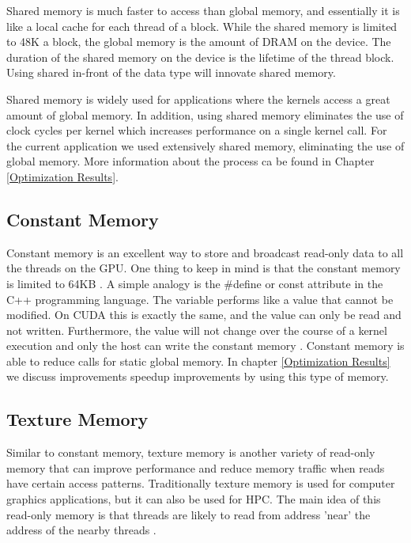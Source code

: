 Shared memory is much faster to access than global memory, and essentially it is like a local cache for each thread of a block. While  the shared memory is limited to 48K a block, the global memory is the amount of DRAM on the device. The duration of the shared memory on the device is the lifetime of the thread block. Using \twoline shared \twoline in-front of the data type will innovate shared memory.

Shared memory is widely used for applications where the kernels access a great amount of global memory. In addition, using shared memory eliminates the use of clock cycles per kernel which increases performance on a single kernel call. For the current application we used extensively shared memory, eliminating the use of global memory. More information about the process ca be found in Chapter \ref{Optimization Results}.

   
\subsection{Constant Memory}

Constant memory is an excellent way to store and broadcast read-only data to all the threads on the GPU. One thing to keep in mind is that the constant memory is limited to 64KB \cite{design}. A simple analogy is the {\listf \#define} or {\listf const} attribute in the C++ programming language. The variable performs like a value that cannot be modified. On CUDA this is exactly the same, and the value can only be read and not written. Furthermore, the value will not change over the course of a kernel execution and only the host can write the constant memory \cite{example}. Constant memory is able to reduce calls for static global memory. In chapter \ref{Optimization Results} we discuss improvements speedup improvements by using this type of memory.
\subsection{Texture Memory}

Similar to constant memory, texture memory is another variety of read-only memory that can improve performance and reduce memory traffic when reads have certain access patterns. Traditionally texture memory is used for computer graphics applications, but it can also be used for HPC. The main idea of this read-only memory is that threads are likely to read from address 'near' the address of the nearby threads \cite{example}.

